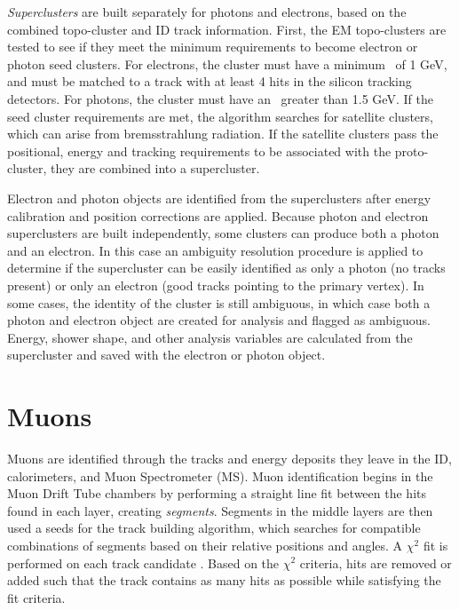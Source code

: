 \textit{Superclusters} are built separately for photons and electrons, based on the combined topo-cluster and ID track information. First, the EM topo-clusters are tested to see if they meet the minimum requirements to become electron or photon seed clusters. For electrons, the cluster must have a minimum \et~of 1 GeV, and must be matched to a track with at least 4 hits in the silicon tracking detectors. For photons, the cluster must have an \et~greater than 1.5 GeV. If the seed cluster requirements are met, the algorithm searches for satellite clusters, which can arise from bremsstrahlung radiation. If the satellite clusters pass the positional, energy and tracking requirements to be associated with the proto-cluster, they are combined into a supercluster. \par

Electron and photon objects are identified from the superclusters after energy calibration and position corrections are applied. Because photon and electron superclusters are built independently, some clusters can produce both a photon and an electron. In this case an ambiguity resolution procedure is applied to determine if the supercluster can be easily identified as only a photon (no tracks present) or only an electron (good tracks pointing to the primary vertex). In some cases, the identity of the cluster is still ambiguous, in which case both a photon and electron object are created for analysis and flagged as ambiguous. Energy, shower shape, and other analysis variables are calculated from the supercluster and saved with the electron or photon object. 

\section{Muons}
Muons are identified through the tracks and energy deposits they leave in the ID, calorimeters, and Muon Spectrometer (MS). Muon identification begins in the Muon Drift Tube chambers by performing a straight line fit between the hits found in each layer, creating \textit{segments}. Segments in the middle layers are then used a seeds for the track building algorithm, which searches for compatible combinations of segments based on their relative positions and angles. A $\chi^2$ fit is performed on each track candidate \cite{muon_reco}. Based on the $\chi^2$ criteria, hits are removed or added such that the track contains as many hits as possible while satisfying the fit criteria. \par

